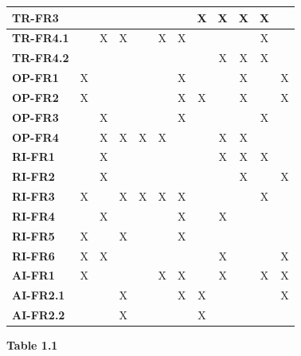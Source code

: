 \documentclass{article}
\begin{document}
\begin{table}[H]
\begin{adjustwidth}{-1.25in}{0in}
{\begin{tabular}{c|c|c|c|c|c|c|c|c|c|c|c|}
\multicolumn{1}{|l|}{\textbf{TR-FR3}} & & & & & & & X & X & X & X & \\ \hline
\multicolumn{1}{|l|}{\textbf{TR-FR4.1}} & & X & X & & X & X & & & & X & \\ \hline
\multicolumn{1}{|l|}{\textbf{TR-FR4.2}} & & & & & & & & X & X & X & \\ \hline
\multicolumn{1}{|l|}{\textbf{OP-FR1}} & X & & & & & X & & & X & & X \\ \hline
\multicolumn{1}{|l|}{\textbf{OP-FR2}} & X & & & & & X & X & & X & & X \\ \hline
\multicolumn{1}{|l|}{\textbf{OP-FR3}} & & X & & & & X & & & & X & \\ \hline
\multicolumn{1}{|l|}{\textbf{OP-FR4}} & & X & X & X & X & & & X & X & & \\ \hline
\multicolumn{1}{|l|}{\textbf{RI-FR1}} & & X & & & & & & X & X & X & \\ \hline
\multicolumn{1}{|l|}{\textbf{RI-FR2}} & & X & & & & & & & X & & X \\ \hline
\multicolumn{1}{|l|}{\textbf{RI-FR3}} & X & & X & X & X & X & & & & X & \\ \hline
\multicolumn{1}{|l|}{\textbf{RI-FR4}} & & X & & & & X & & X & & & \\ \hline
\multicolumn{1}{|l|}{\textbf{RI-FR5}} & X & & X & & & X & & & & & \\ \hline
\multicolumn{1}{|l|}{\textbf{RI-FR6}} & X & X & & & & & & X & & & X \\ \hline
\multicolumn{1}{|l|}{\textbf{AI-FR1}} & X & & & & X & X & & X & & X & X \\ \hline
\multicolumn{1}{|l|}{\textbf{AI-FR2.1}} & & & X & & & X & X & & & & X \\ \hline
\multicolumn{1}{|l|}{\textbf{AI-FR2.2}} & & & X & & & & X & & & & \\ \hline
\end{tabular}
}
\begin{center}
    \textbf{Table 1.1}
\end{center}
\end{adjustwidth}
\end{table}
\end{document}
